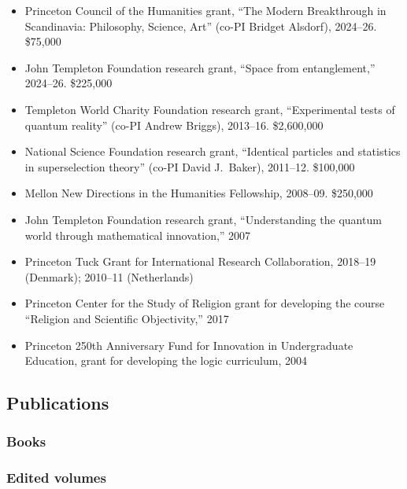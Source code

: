 \documentclass[11pt]{article}
\newcounter{npubbook}
\newcounter{npubedited}
\newcounter{bibnum}
\newcommand*{\pubsfrom}[1]{\setcounter{bibnum}{\numexpr\value{#1}+1\relax}}
\begin{document}
\begin{itemize}
\item Princeton Council of the Humanities grant, ``The Modern Breakthrough in
  Scandinavia: Philosophy, Science, Art'' (co-PI Bridget Alsdorf), 2024--26.
  \$75,000
\item John Templeton Foundation research grant, ``Space from entanglement,''
  2024--26. \$225,000
\item Templeton World Charity Foundation research grant, ``Experimental tests
  of quantum reality'' (co-PI Andrew Briggs), 2013--16. \$2,600,000
\item National Science Foundation research grant, ``Identical particles and
  statistics in superselection theory'' (co-PI David J.\ Baker), 2011--12.
  \$100,000
\item Mellon New Directions in the Humanities Fellowship, 2008--09. \$250,000
\item John Templeton Foundation research grant, ``Understanding the quantum
  world through mathematical innovation,'' 2007
\item Princeton Tuck Grant for International Research Collaboration, 2018--19
  (Denmark); 2010--11 (Netherlands)
\item Princeton Center for the Study of Religion grant for developing the
  course ``Religion and Scientific Objectivity,'' 2017
\item Princeton 250th Anniversary Fund for Innovation in Undergraduate
  Education, grant for developing the logic curriculum, 2004
\end{itemize}


\subsection*{Publications}

\nocite{*}
\renewcommand{\bibsetup}{\setlength{\bibitemsep}{0.5em}\raggedright}

\subsubsection*{Books}
\pubsfrom{npubbook}
\printbibliography[heading=none,keyword=book-authored]

\subsubsection*{Edited volumes}
\pubsfrom{npubedited}
\printbibliography[heading=none,keyword=book-edited]
\end{document}
